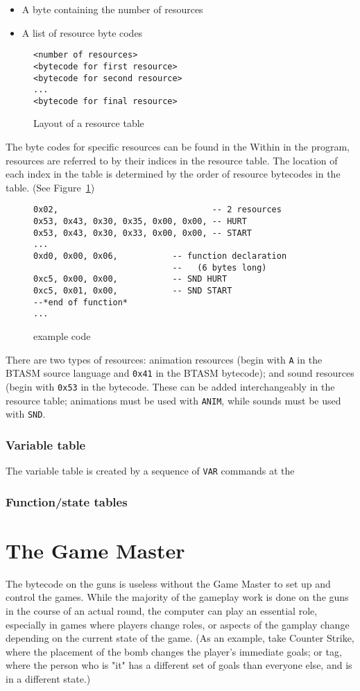 \documentclass[12pt,a4paper]{scrbook}
\begin{document}
\begin{itemize}
\item A byte containing the number of resources
\item A list of resource byte codes
\end{itemize}
\begin{figure}[h]
\begin{lstlisting}
<number of resources>
<bytecode for first resource>
<bytecode for second resource>
...
<bytecode for final resource>
\end{lstlisting}
\caption{Layout of a resource table} 
\end{figure}

The byte codes for specific resources can be found in the 
Within in the program, resources are referred to by their indices in the resource table.  The
location of each index in the table is determined by the order of resource bytecodes in the
table.  (See Figure~\ref{Resource table})
\begin{figure}[h]
\begin{lstlisting}
0x02,								-- 2 resources
0x53, 0x43, 0x30, 0x35, 0x00, 0x00, -- HURT
0x53, 0x43, 0x30, 0x33, 0x00, 0x00,	-- START
...
0xd0, 0x00, 0x06, 			-- function declaration 
							--   (6 bytes long)
0xc5, 0x00, 0x00,			-- SND HURT
0xc5, 0x01, 0x00,			-- SND START
--*end of function*
...
\end{lstlisting}
\caption{\label{Resource table} example code} 
\end{figure}

There are two types of resources: animation resources (begin with \texttt{A} in the BTASM source
language and \texttt{0x41} in the BTASM bytecode); and sound resources (begin with \texttt{0x53}
in the bytecode.  These can be added interchangeably in the resource table; animations must be
used with \texttt{ANIM}, while sounds must be used with \texttt{SND}.


\subsection{Variable table}
\label{sec:vartable}
The variable table is created by a sequence of \texttt{VAR} commands at the 

\subsection{Function/state tables}
\label{sec:funstatetables}

\chapter{The Game Master}
The bytecode on the guns is useless without the Game Master to set up and control the games.  While
the majority of the gameplay work is done on the guns in the course of an actual round, the computer
can play an essential role, especially in games where players change roles, or aspects of the 
gamplay change depending on the current state of the game.  (As an example, take Counter Strike, 
where the placement of the bomb changes the player's immediate goals; or tag, where the person who
is "it" has a different set of goals than everyone else, and is in a different state.)
\end{document}
